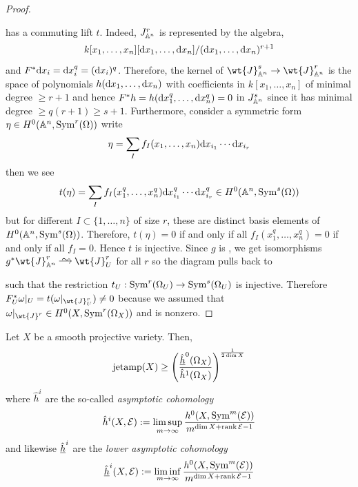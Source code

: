 \documentclass[main.tex]{subfiles}
\begin{document}
\begin{proof}
\begin{center}
\end{center}
has a commuting lift $t$. Indeed, $J^r_{\mathbb{A}^n}$ is represented by the algebra,
\[ k[x_1, \dots, x_n][\mathrm{d}{x_1}, \dots, \mathrm{d}{x_n}] / (\mathrm{d}{x_1}, \dots, \mathrm{d}{x_n})^{r+1} \] and $F^* \mathrm{d}{x_i} = \mathrm{d}{x_i^{q}} = (\mathrm{d}{x_i})^{q}$. Therefore, the kernel of $\wt{J}^s_{\A^n} \to \wt{J}^r_{\A^n}$ is the space of polynomials $h(\mathrm{d}{x_1}, \dots, \mathrm{d}{x_n})$ with coefficients in $k[x_1, \dots, x_n]$ of minimal degree $\ge r + 1$ and hence $F^* h = h(\mathrm{d}{x_1^{q}}, \dots, \mathrm{d}{x_n^{q}}) = 0$ in $J^s_{\mathbb{A}^n}$ since it has minimal degree $\ge q (r + 1) \ge s + 1$. Furthermore, consider a symmetric form $\eta \in H^0(\mathbb{A}^n, \mathrm{Sym}^{r}\! \left( \Omega \right))$ write
\[ \eta = \sum_{I} f_I(x_1, \dots, x_n) \mathrm{d}{x_{i_1}} \cdots \mathrm{d}{x_{i_r}} \]
then we see
\[ t(\eta) = \sum_I f_I(x_1^q, \dots, x_n^q) \mathrm{d}{x_{i_1}^q} \cdots \mathrm{d}{x_{i_r}^q} \in H^0(\mathbb{A}^n, \mathrm{Sym}^{s}\! \left( \Omega \right)) \]
but for different $I \subset \{1, \dots, n\}$ of size $r$, these are distinct basis elements of $H^0(\mathbb{A}^n, \mathrm{Sym}^{s}\! \left( \Omega \right))$. Therefore, $t(\eta) = 0$ if and only if all $f_I(x_1^q, \dots, x_n^q) = 0$ if and only if all $f_I = 0$. Hence $t$ is injective. Since $g$ is \etale, we get isomorphisms $g^* \wt{J}_{\A^n}^r \iso \wt{J}^r_{U}$ for all $r$ so the diagram pulls back to
\begin{center}
\end{center}
such that the restriction $t_U : \mathrm{Sym}^{r}\! \left( \Omega_U \right) \to \mathrm{Sym}^{s}\! \left( \Omega_U \right)$ is injective. Therefore $F^*_U \omega|_U = t(\omega|_{\wt{J}^r_U}) \neq 0$ because we assumed that $\omega|_{\wt{J}^r} \in H^0(X, \nSym{r}{\Omega_X})$ and is nonzero.
\end{proof}

\begin{prop}
Let $X$ be a smooth projective variety. Then,
\[ \mathrm{jetamp}(X) \ge \left(\frac{\underline{\hat{h}}^0(\Omega_X)}{\hat{h}^1(\Omega_X)}\right)^{\frac{1}{2 \dim{X}}} \]
where $\hat{h}^i$ are the so-called \textit{asymptotic cohomology}
\[ \hat{h}^i(X, \mathcal{E}) := \limsup_{m \to \infty} \frac{h^0(X, \mathrm{Sym}^{m}\! \left( \mathcal{E} \right))}{m^{\dim{X} + \operatorname{\mathrm{rank}}{\mathcal{E}} - 1}} \]
and likewise $\underline{\hat{h}}^i$ are the \textit{lower asymptotic cohomology}
\[ \underline{\hat{h}}^i(X, \mathcal{E}) := \liminf_{m \to \infty} \frac{h^0(X, \mathrm{Sym}^{m}\! \left( \mathcal{E} \right))}{m^{\dim{X} + \operatorname{\mathrm{rank}}{\mathcal{E}} - 1}} \]
\end{prop}
\end{document}
